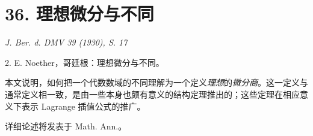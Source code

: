 \documentclass[11pt]{article}
\begin{document}
\setcounter{footnote}{0}

\section*{36. 理想微分与不同}

\begin{center}
\emph{J. Ber. d. DMV 39 (1930), S. 17}
\end{center}

2. E. Noether，哥廷根：理想微分与不同。

本文说明，如何把一个代数数域的不同理解为一个定义\emph{理想}的\emph{微分商}。这一定义与通常定义相一致，是由一些本身也颇有意义的结构定理推出的；这些定理在相应意义下表示 Lagrange 插值公式的推广。

详细论述将发表于 Math. Ann.。

\clearpage
\setcounter{footnote}{0}
\end{document}

